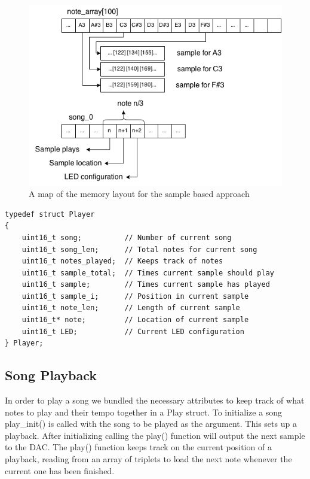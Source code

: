\begin{figure}[ht]
  \centering
  \includegraphics[width=\textwidth]{images/sample_array_layout.png}
  \caption{A map of the memory layout for the sample based approach}\label{fig:array_layout}
\end{figure}

\begin{minipage}{\textwidth}
\begin{lstlisting}
typedef struct Player
{
	uint16_t song;			// Number of current song
	uint16_t song_len;		// Total notes for current song
	uint16_t notes_played;	// Keeps track of notes
	uint16_t sample_total;	// Times current sample should play	
	uint16_t sample;		// Times current sample has played
	uint16_t sample_i;		// Position in current sample 
	uint16_t note_len;		// Length of current sample
	uint16_t* note;			// Location of current sample
	uint16_t LED;			// Current LED configuration
} Player;
\end{lstlisting}
\end{minipage}

\subsection{Song Playback}
In order to play a song we bundled the necessary attributes to keep track of what notes to play and their tempo together in a Play struct. To initialize a song play\_init() is called with the song to be played as the argument. This sets up a playback. After initializing calling the play() function will output the next sample to the DAC.
The play() function keeps track on the current position of a playback, reading from an array of triplets to load the next note whenever the current one has been finished. \\

